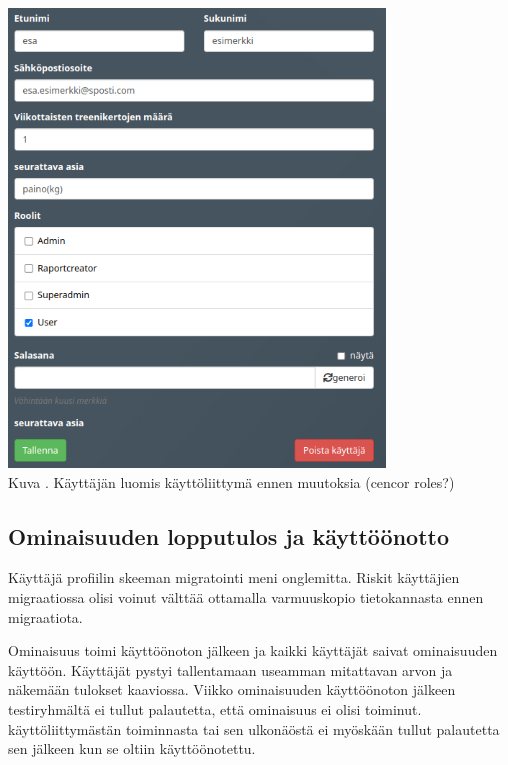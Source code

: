 \bigskip


\includegraphics[width = 10cm]{src/public/oppar/adminUserProfilePre.png}\\
Kuva \getImgCount {}. Käyttäjän luomis käyttöliittymä ennen muutoksia (cencor roles?)
\medskip










\subsection{Ominaisuuden lopputulos ja käyttöönotto}


Käyttäjä profiilin skeeman migratointi meni onglemitta.
Riskit käyttäjien migraatiossa olisi voinut välttää ottamalla varmuuskopio tietokannasta ennen migraatiota.
\medskip

Ominaisuus toimi käyttöönoton jälkeen ja kaikki käyttäjät saivat ominaisuuden käyttöön.
Käyttäjät pystyi tallentamaan useamman mitattavan arvon ja näkemään tulokset kaaviossa.
Viikko ominaisuuden käyttöönoton jälkeen testiryhmältä ei tullut palautetta, että ominaisuus ei olisi toiminut.
käyttöliittymästän toiminnasta tai sen ulkonäöstä ei myöskään tullut palautetta sen jälkeen kun se oltiin käyttöönotettu. 
\medskip

